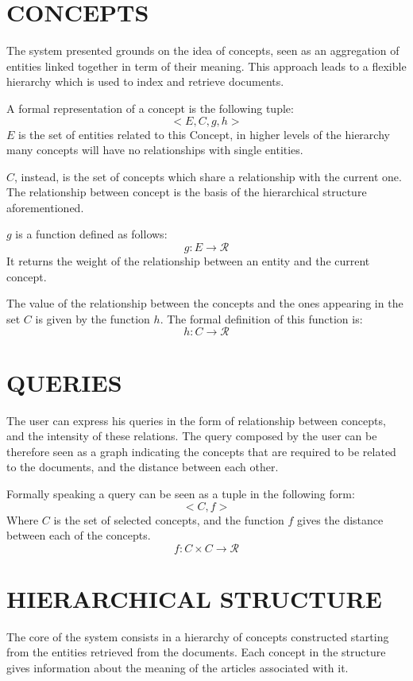 \documentclass{acm_proc_article-sp-sigmod07}
\begin{document}
\section{CONCEPTS}
The system presented grounds on the idea of concepts, seen as an
aggregation of entities linked together in term of their meaning.
This approach leads to a flexible hierarchy which is used to index and
retrieve documents.

A formal representation of a concept is the following tuple:
$$
<E, C, g, h>
$$
$E$ is the set of entities related to this Concept, in higher levels of
the hierarchy many concepts will have no relationships with single
entities.

$C$, instead, is the set of concepts which share a relationship with the
current one. The relationship between concept is the basis of the
hierarchical structure aforementioned.

$g$ is a function defined as follows:
$$
g: E \rightarrow \mathcal{R}
$$
It returns the weight of the relationship between an entity and the
current concept.

The value of the relationship between the concepts and the ones appearing
in the set $C$ is given by the function $h$. The formal definition of this
function is:
$$
h: C \rightarrow \mathcal{R}
$$

\section{QUERIES}
The user can express his queries in the form of relationship between
concepts, and the intensity of these relations. 
The query composed by the user can be therefore seen as a graph indicating
the concepts that are required to be related to the documents, and the
distance between each other.

Formally speaking a query can be seen as a tuple in the following form:
$$
<C, f>
$$
Where $C$ is the set of selected concepts, and the function $f$ gives the
distance between each of the concepts.
$$
f: C \times C \rightarrow \mathcal{R}
$$

\section{HIERARCHICAL STRUCTURE}
The core of the system consists in a hierarchy of concepts constructed
starting from the entities retrieved from the documents. Each concept in
the structure gives information about the meaning of the articles
associated with it.
\end{document}
